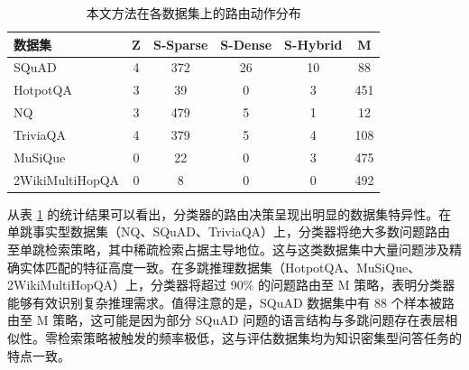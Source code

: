 \begin{table}[htbp]
    \centering
    \caption{本文方法在各数据集上的路由动作分布}
    \label{tab:action_distribution}
    \renewcommand{\arraystretch}{1.3}
    \begin{tabular}{l c c c c c}
        \toprule
        \textbf{数据集} & \textbf{Z} & \textbf{S-Sparse} & \textbf{S-Dense} & \textbf{S-Hybrid} & \textbf{M} \\
        \midrule
        SQuAD & 4 & 372 & 26 & 10 & 88 \\
        HotpotQA & 3 & 39 & 0 & 3 & 451 \\
        NQ & 3 & 479 & 5 & 1 & 12 \\
        TriviaQA & 4 & 379 & 5 & 4 & 108 \\
        MuSiQue & 0 & 22 & 0 & 3 & 475 \\
        2WikiMultiHopQA & 0 & 8 & 0 & 0 & 492 \\
        \bottomrule
    \end{tabular}
\end{table}

从表 \ref{tab:action_distribution} 的统计结果可以看出，分类器的路由决策呈现出明显的数据集特异性。在单跳事实型数据集（NQ、SQuAD、TriviaQA）上，分类器将绝大多数问题路由至单跳检索策略，其中稀疏检索占据主导地位。这与这类数据集中大量问题涉及精确实体匹配的特征高度一致。在多跳推理数据集（HotpotQA、MuSiQue、2WikiMultiHopQA）上，分类器将超过 90\% 的问题路由至 M 策略，表明分类器能够有效识别复杂推理需求。值得注意的是，SQuAD 数据集中有 88 个样本被路由至 M 策略，这可能是因为部分 SQuAD 问题的语言结构与多跳问题存在表层相似性。零检索策略被触发的频率极低，这与评估数据集均为知识密集型问答任务的特点一致。

